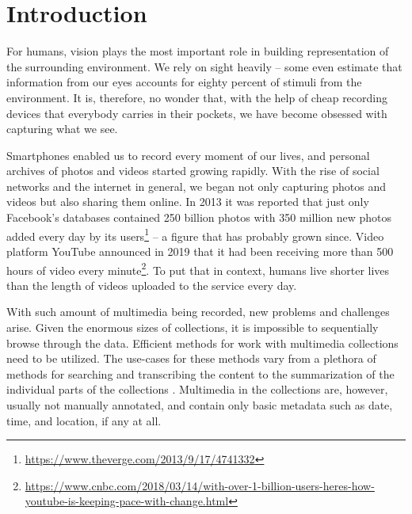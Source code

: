 \chapter*{Introduction}

For humans, vision plays the most important role in building representation of the surrounding environment. We rely on sight heavily -- some even estimate that information from our eyes accounts for eighty percent of stimuli from the environment. It is, therefore, no wonder that, with the help of cheap recording devices that everybody carries in their pockets, we have become obsessed with capturing what we see.

Smartphones enabled us to record every moment of our lives, and personal archives of photos and videos started growing rapidly. With the rise of social networks and the internet in general, we began not only capturing photos and videos but also sharing them online. In 2013 it was reported that just only Facebook's databases contained 250 billion photos with 350 million new photos added every day by its users\footnote{\url{https://www.theverge.com/2013/9/17/4741332}} -- a figure that has probably grown since. Video platform YouTube announced in 2019 that it had been receiving more than 500 hours of video every minute\footnote{\url{https://www.cnbc.com/2018/03/14/with-over-1-billion-users-heres-how-youtube-is-keeping-pace-with-change.html}}. To put that in context, humans live shorter lives than the length of videos uploaded to the service every day.

With such amount of multimedia being recorded, new problems and challenges arise. Given the enormous sizes of collections, it is impossible to sequentially browse through the data. Efficient methods for work with multimedia collections need to be utilized. The use-cases for these methods vary from a plethora of methods for searching and transcribing the content to the summarization of the individual parts of the collections \cite{zhang2019pegasus_textsum,Miech_2019_ICCV_HowTo100M,zhou2018deep_videosum}.
Multimedia in the collections are, however, usually not manually annotated, and contain only basic metadata such as date, time, and location, if any at all.

